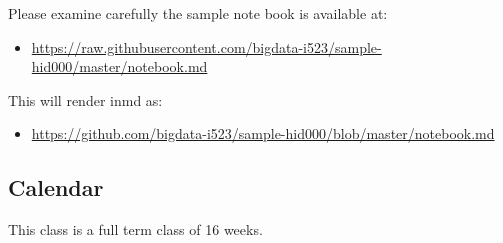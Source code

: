 Please examine carefully the sample note book is available at:

\begin{itemize}
\tightlist
\item
  \url{https://raw.githubusercontent.com/bigdata-i523/sample-hid000/master/notebook.md}
\end{itemize}

This will render inmd as:

\begin{itemize}
\tightlist
\item
  \url{https://github.com/bigdata-i523/sample-hid000/blob/master/notebook.md}
\end{itemize}

\subsection{Calendar}\label{calendar}

This class is a full term class of 16 weeks.

